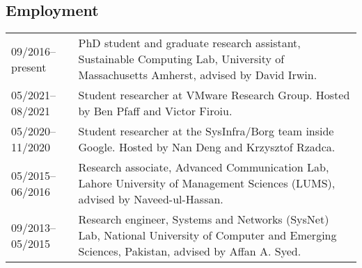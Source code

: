 \documentclass[11pt, a4paper, DIV=12]{scrartcl}
\begin{document}
\subsection*{Employment}
\begin{tabular}{p{3.0cm}p{11.5cm}}
	09/2016--present&PhD student and graduate research assistant, Sustainable Computing Lab, University of Massachusetts Amherst, advised by David Irwin.\\
	05/2021--08/2021& Student researcher at VMware Research Group. Hosted by Ben Pfaff and Victor Firoiu.\\
	05/2020--11/2020& Student researcher at the SysInfra/Borg team inside Google. Hosted by Nan Deng and Krzysztof Rzadca.\\
	05/2015--06/2016&Research associate, Advanced Communication Lab, Lahore University of Management Sciences (LUMS), advised by Naveed-ul-Hassan.\\
	09/2013--05/2015&Research engineer, Systems and Networks (SysNet) Lab, National University of Computer and Emerging Sciences, Pakistan, advised by Affan A. Syed.\\
\end{tabular}

\renewcommand{\refname}{\large\bfseries Publications}
\end{document}
